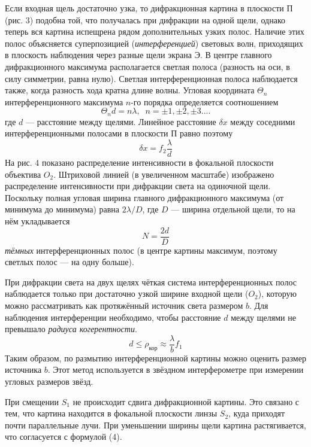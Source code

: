 \documentclass[a4paper,12pt]{extarticle}
\begin{document}
Если входная щель достаточно узка, то дифракционная картина в плоскости П (рис. 3) подобна той, что получалась при дифракции на одной щели, однако теперь вся картина испещрена рядом дополнительных узких полос. Наличие этих полос объясняется суперпозицией (\textit{интерференцией}) световых волн, приходящих в плоскость наблюдения через разные щели экрана Э. В центре главного дифракционного максимума располагается светлая
полоса (разность на оси, в силу симметрии, равна нулю). Светлая интерференционная полоса наблюдается также, когда разность хода кратна длине волны. Угловая координата $\Theta_n$ интерференционного максимума $n$-го порядка определяется соотношением
\begin{equation}
    \Theta_n d = n \lambda, \;\; n = \pm1, \pm2, \pm3....
\end{equation}
где $d$ — расстояние между щелями. Линейное расстояние $\delta x$ между соседними интерференционными полосами в плоскости П равно поэтому
\begin{equation}
    \delta x = f_2 \frac{\lambda}{d}
\end{equation}
На рис. 4 показано распределение интенсивности в фокальной плоскости объектива $O_2$. Штриховой линией (в увеличенном масштабе) изображено распределение интенсивности при дифракции света на одиночной щели. Поскольку полная угловая ширина главного дифракционного максимума (от минимума до минимума) равна $2\lambda/D$, где $D$ — ширина
отдельной щели, то на нём укладывается
\begin{equation}
    N = \frac{2d}{D}
\end{equation}
\textit{тёмных} интерференционных полос (в центре картины максимум, поэтому светлых полос
— на одну больше). 

При дифракции света на двух щелях чёткая система интерференционных полос наблюдается только при достаточно узкой ширине входной щели ($O_2$), которую можно рассматривать как протяжённый источник света размером $b$. Для наблюдения интерференции необходимо, чтобы расстояние $d$ между щелями не превышало \textit{радиуса когерентности}.
\begin{equation}
    d \leq \rho_{\text{кор}} \approx \frac{\lambda}{b} f_1
\end{equation}
Таким образом, по размытию интерференционной картины можно оценить размер источника $b$. Этот метод используется в звёздном интерферометре при измерении угловых размеров звёзд.

\textbf{} При смещении $S_1$ не происходит сдвига дифракционной картины. 
Это связано с тем, что картина находится в фокальной плоскости 
линзы $S_2$, куда приходят почти параллельные лучи. При уменьшении 
ширины щели картина растягивается, что согласуется с формулой (4).
\end{document}
